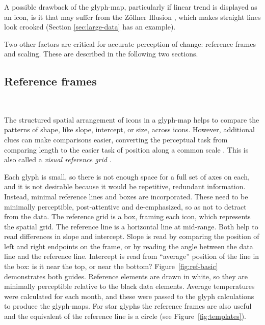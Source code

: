 \documentclass[oneside]{article}
\begin{document}
A possible drawback of the glyph-map, particularly if linear trend is displayed as an icon, is it that may suffer from the Z\"ollner Illusion \citep{Zollner}, which makes straight lines look crooked (Section \ref{sec:large-data} has an example).

Two other factors are critical for accurate perception of change: reference frames and scaling. These are described in the following two sections.

\subsection{Reference frames}~\label{sec:reference}

The structured spatial arrangement of icons in a glyph-map helps to compare the patterns of shape, like slope, intercept, or size, across icons. However, additional clues can make comparisons easier, converting the perceptual task from comparing length to the easier task of position along a common scale \citep{cleveland:1984}. This is also called a \emph{visual reference grid} \citep{cleveland:1993a}.

Each glyph is small, so there is not enough space for a full set of axes on each, and it is not desirable because it would be repetitive, redundant information. Instead, minimal reference lines and boxes are incorporated. These need to be minimally perceptible, post-attentive \citep{healey} and de-emphasized, so as not to detract from the data. The reference grid is a box, framing each icon, which represents the spatial grid. The reference line is a horizontal line at mid-range. Both help to read differences in slope and intercept. Slope is read by comparing the position of left and right endpoints on the frame, or by reading the angle between the data line and the reference line. Intercept is read from ``average'' position of the line in the box: is it near the top, or near the bottom? Figure~\ref{fig:ref-basic} demonstrates both guides. Reference elements are drawn in white, so they are minimally perceptible relative to the black data elements. Average temperatures were calculated for each month, and these were passed to the glyph calculations to produce the glyph-maps.   For star glyphs the reference frames are also useful and the equivalent of the reference line is a circle (see Figure~\ref{fig:templates}).
\end{document}
